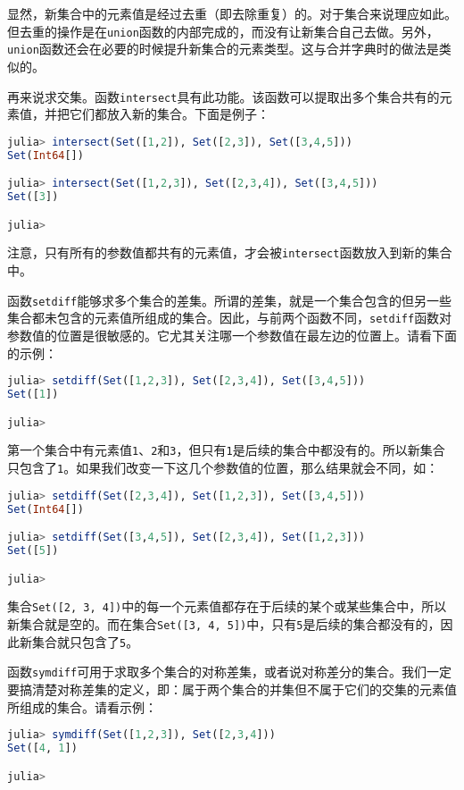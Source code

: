 显然，新集合中的元素值是经过去重（即去除重复）的。对于集合来说理应如此。但去重的操作是在\verb|union|函数的内部完成的，而没有让新集合自己去做。另外，\verb|union|函数还会在必要的时候提升新集合的元素类型。这与合并字典时的做法是类似的。

再来说求交集。函数\verb|intersect|具有此功能。该函数可以提取出多个集合共有的元素值，并把它们都放入新的集合。下面是例子：

\begin{lstlisting}[language=julia]
julia> intersect(Set([1,2]), Set([2,3]), Set([3,4,5]))
Set(Int64[])

julia> intersect(Set([1,2,3]), Set([2,3,4]), Set([3,4,5]))
Set([3])

julia> 
\end{lstlisting}

注意，只有所有的参数值都共有的元素值，才会被\verb|intersect|函数放入到新的集合中。

函数\verb|setdiff|能够求多个集合的差集。所谓的差集，就是一个集合包含的但另一些集合都未包含的元素值所组成的集合。因此，与前两个函数不同，\verb|setdiff|函数对参数值的位置是很敏感的。它尤其关注哪一个参数值在最左边的位置上。请看下面的示例：

\begin{lstlisting}[language=julia]
julia> setdiff(Set([1,2,3]), Set([2,3,4]), Set([3,4,5]))
Set([1])

julia> 
\end{lstlisting}

第一个集合中有元素值\verb|1|、\verb|2|和\verb|3|，但只有\verb|1|是后续的集合中都没有的。所以新集合只包含了\verb|1|。如果我们改变一下这几个参数值的位置，那么结果就会不同，如：

\begin{lstlisting}[language=julia]
julia> setdiff(Set([2,3,4]), Set([1,2,3]), Set([3,4,5]))
Set(Int64[])

julia> setdiff(Set([3,4,5]), Set([2,3,4]), Set([1,2,3]))
Set([5])

julia> 
\end{lstlisting}

集合\verb|Set([2, 3, 4])|中的每一个元素值都存在于后续的某个或某些集合中，所以新集合就是空的。而在集合\verb|Set([3, 4, 5])|中，只有\verb|5|是后续的集合都没有的，因此新集合就只包含了\verb|5|。

函数\verb|symdiff|可用于求取多个集合的对称差集，或者说对称差分的集合。我们一定要搞清楚对称差集的定义，即：属于两个集合的并集但不属于它们的交集的元素值所组成的集合。请看示例：

\begin{lstlisting}[language=julia]
julia> symdiff(Set([1,2,3]), Set([2,3,4]))
Set([4, 1])

julia> 
\end{lstlisting}


